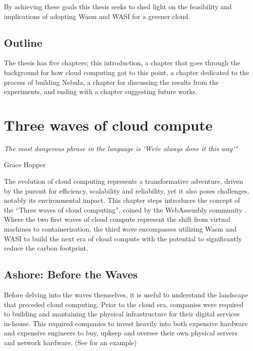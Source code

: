 \documentclass[
  table]{report}
\begin{document}
By achieving these goals this thesis seeks to shed light on the
feasibility and implications of adopting \ac{Wasm} and \ac{WASI} for a
greener cloud.

\section{Outline}

The thesis has five chapters; this introduction, a chapter that goes
through the background for how cloud computing got to this point, a
chapter dedicated to the process of building Nebula, a chapter for
discussing the results from the experiments, and ending with a chapter
suggesting future works.


\newpage

\chapter{Three waves of cloud compute}
\label{chap:three-waves}

\setlength{}

\epigraph{\itshape 
The most dangerous phrase in the language is `We\'ve always done it this way`"
}{Grace Hopper}

The evolution of cloud computing represents a transformative adventure,
driven by the pursuit for efficiency, scalability and reliability, yet
it also poses challenges, notably its environmental impact. This chapter
steps introduces the concept of the ``Three waves of cloud computing'',
coined by the WebAssembly community
\citep*{butcherDodds2024, leonardWebAssemblyHeraldsThird2024}. Where the
two first waves of cloud compute represent the shift from virtual
machines to containerization, the third wave encompasses utilizing
\ac{Wasm} and \ac{WASI} to build the next era of cloud compute with the
potential to significantly reduce the carbon footprint.

\section{Ashore: Before the Waves}
\label{sect:ashore}

Before delving into the waves themselves, it is useful to understand the
landscape that preceded cloud computing. Prior to the cloud era,
companies were required to building and mantaining the physical
infrastructure for their digital services in-house. This required
companies to invest heavily into both expensive hardware and expensive
engineers to buy, upkeep and oversee their own physical servers and
network hardware. (See  for an example)
\end{document}
